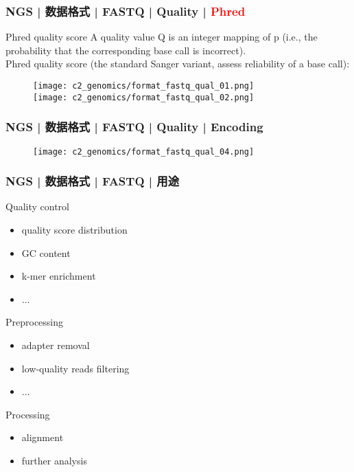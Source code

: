 \begin{frame}
  \frametitle{NGS | 数据格式 | FASTQ | Quality | \textcolor{red}{Phred}}
  \begin{block}{Phred quality score}
A quality value Q is an integer mapping of p (i.e., the probability that the corresponding base call is incorrect).\\
\vspace{1em}
Phred quality score (the standard Sanger variant, assess reliability of a base call):
  \end{block}
  \begin{figure}
    \centering
    \texttt{[image: c2\_genomics/format\_fastq\_qual\_01.png]}\\
    \vspace{1em}
    \texttt{[image: c2\_genomics/format\_fastq\_qual\_02.png]}
  \end{figure}
\end{frame}

\begin{frame}
  \frametitle{NGS | 数据格式 | FASTQ | Quality | Encoding}
  \begin{figure}
    \centering
    \texttt{[image: c2\_genomics/format\_fastq\_qual\_04.png]}
  \end{figure}
\end{frame}

\begin{frame}
  \frametitle{NGS | 数据格式 | FASTQ | 用途}
  \begin{block}{Quality control}
    \begin{itemize}
      \item quality score distribution
      \item GC content
      \item k-mer enrichment
      \item ...
    \end{itemize}
  \end{block}
  \pause
  \begin{block}{Preprocessing}
    \begin{itemize}
      \item adapter removal
      \item low-quality reads filtering
      \item ...
    \end{itemize}
  \end{block}
  \pause
  \begin{block}{Processing}
    \begin{itemize}
      \item alignment
      \item further analysis
    \end{itemize}
  \end{block}
\end{frame}

